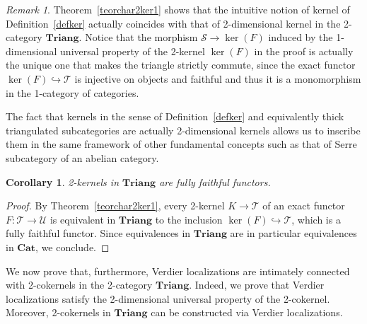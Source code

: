 \documentclass[11pt,reqno,a4paper]{amsart}
\newtheorem{corollary}[theorem]{Corollary}
\theoremstyle{definition}
\theoremstyle{remark}
\newtheorem{remark}[theorem]{Remark}
\def\nameit#1{\textrm{#1}~}
\def\thex{\nameit{Theorem}}
\def\defx{\nameit{Definition}}
\newcommand{\T}{\mathcal{T}}
\renewcommand{\S}{\mathcal{S}}
\newcommand{\U}{\mathcal{U}}
\newcommand{\0}{\mathbf{0}}
\renewcommand{\1}{\mathbf{1}}
\newcommand{\Cat}{\mathbf{Cat}}
\newcommand{\Triang}{\mathbf{Triang}}
\def\:{\colon}
\begin{document}
\begin{remark}
    \thex \ref{teorchar2ker1} shows that the intuitive notion of kernel of \defx \ref{defker} actually coincides with that of 2-dimensional kernel in the 2-category $\Triang$. Notice that the morphism $\S \rightarrow \ker(F)$ induced by the 1-dimensional universal property of the 2-kernel $\ker(F)$ in the proof is actually the unique one that makes the triangle strictly commute, since the exact functor $\ker(F) \hookrightarrow \T$ is injective on objects and faithful and thus it is a monomorphism in the 1-category of categories.

    The fact that kernels in the sense of \defx \ref{defker} and equivalently thick triangulated subcategories are actually 2-dimensional kernels allows us to inscribe them in the same framework of other fundamental concepts such as that of Serre subcategory of an abelian category.
\end{remark}

\begin{corollary}\label{cor2kerareff}
    2-kernels in $\Triang$ are fully faithful functors.
\end{corollary}
\begin{proof}
    By \thex\ref{teorchar2ker1}, every 2-kernel $K\to \T$ of an exact functor $F\:\T\to \U$ is equivalent in $\Triang$ to the inclusion $\ker(F)\hookrightarrow \T$, which is a fully faithful functor. Since equivalences in $\Triang$ are in particular equivalences in $\Cat$, we conclude.
\end{proof}

We now prove that, furthermore, Verdier localizations are intimately connected with 2-cokernels in the 2-category $\Triang$. Indeed, we prove that Verdier localizations satisfy the 2-dimensional universal property of the 2-cokernel. Moreover, 2-cokernels in $\Triang$ can be constructed via Verdier localizations.
\end{document}

